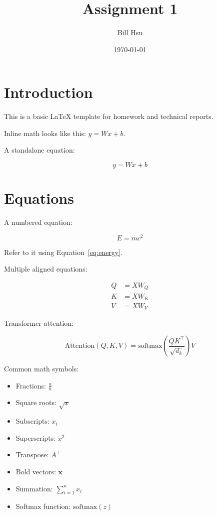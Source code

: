\documentclass[11pt]{article}
\title{Assignment 1}
\author{Bill Hsu}
\date{\today}
\begin{document}
\maketitle

\section{Introduction}

This is a basic LaTeX template for homework and technical reports.

Inline math looks like this: $y = Wx + b$.

A standalone equation:

\[
y = Wx + b
\]

\section{Equations}

A numbered equation:

\begin{equation}
    E = mc^2
    \label{eq:energy}
\end{equation}

Refer to it using Equation~\ref{eq:energy}.

Multiple aligned equations:

\begin{align}
    Q &= XW_Q \\
    K &= XW_K \\
    V &= XW_V
\end{align}

Transformer attention:

\begin{equation}
    \mathrm{Attention}(Q,K,V)
    =
    \mathrm{softmax}
    \left(
    \frac{QK^\top}{\sqrt{d_k}}
    \right)V
\end{equation}

Common math symbols:
\begin{itemize}
    \item Fractions: $\frac{a}{b}$
    \item Square roots: $\sqrt{x}$
    \item Subscripts: $x_i$
    \item Superscripts: $x^2$
    \item Transpose: $A^\top$
    \item Bold vectors: $\mathbf{x}$
    \item Summation: $\sum_{i=1}^{n} x_i$
    \item Softmax function: $\mathrm{softmax}(z)$
\end{itemize}
\end{document}
